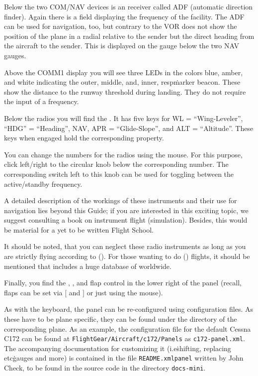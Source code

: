 Below the two COM/NAV devices is an  receiver called ADF (automatic
direction
finder). Again there is a field displaying the frequency of the facility. The
ADF can be
used for navigation, too, but contrary to the VOR does not show the position of
the plane
in a radial relative to the sender but the direct heading from the aircraft to
the
sender. This is displayed on the gauge below the two NAV gauges.

Above the COMM1 display you will see three LEDs in the colors blue, amber, and
white
indicating the outer, middle, and, inner, resp\. marker beacon. These show the distance to the
runway
threshold during landing. They do not require the input of a frequency. 

Below the radios you will find the . It has five keys
for WL = ``Wing-Leveler'', ``HDG'' = ``Heading'', NAV, APR =
``Glide-Slope'', and ALT = ``Altitude''. These keys when engaged hold
the corresponding property.

You can change the numbers for the radios using the mouse. For this
purpose, click left/right to the circular knob below the corresponding
number. The corresponding switch left to this knob can be used for
toggling between the active/standby frequency.

A detailed description of the workings of these instruments and their use for
navigation
lies beyond this Guide; if you are interested in this exciting topic, we suggest
consulting a book on instrument flight (simulation). Besides, this would be
material for
a yet to be written \FlightGear{} Flight School. 

It should be noted, that you can neglect these radio instruments as
long as you are strictly flying according to  (). For those wanting to do  () flights, it should be mentioned that \FlightGear{}
includes a huge database of  worldwide.

Finally, you find the , , and flap
control in
the lower right of the panel (recall, flaps can be set via $[$ and $]$ or just
using the mouse).

As with the keyboard, the panel can be
re-configured using
configuration files. As these have to be plane specific, they can be found under
the
directory of the corresponding plane. As an example, the configuration file for
the
default Cessna C172 can be found at \texttt{FlightGear/Aircraft/c172/Panels} as
\texttt{c172-panel.xml}. The accompanying documentation for customizing it
(i.e\. shifting,
replacing etc\. gauges and more) is contained in the file
\texttt{README.xmlpanel} 
written by John Check,
to be found in the source code in the directory \texttt{docs-mini}.

